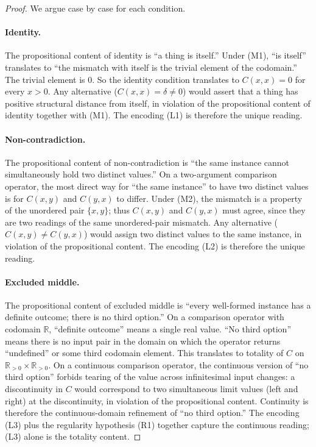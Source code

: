 \documentclass[11pt,a4paper]{article}
\theoremstyle{definition}
\theoremstyle{remark}
\begin{document}
\begin{proof}
We argue case by case for each condition.

\paragraph{Identity.} The propositional content of identity is ``a
thing is itself.'' Under (M1), ``is itself'' translates to ``the
mismatch with itself is the trivial element of the codomain.'' The
trivial element is $0$. So the identity condition translates to
$C(x, x) = 0$ for every $x > 0$. Any alternative
($C(x, x) = \delta \neq 0$) would assert that a thing has positive
structural distance from itself, in violation of the propositional
content of identity together with (M1). The encoding (L1) is therefore
the unique reading.

\paragraph{Non-contradiction.} The propositional content of
non-contradiction is ``the same instance cannot simultaneously hold
two distinct values.'' On a two-argument comparison operator, the
most direct way for ``the same instance'' to have two distinct values
is for $C(x, y)$ and $C(y, x)$ to differ. Under (M2), the mismatch is
a property of the unordered pair $\{x, y\}$; thus $C(x, y)$ and
$C(y, x)$ must agree, since they are two readings of the same
unordered-pair mismatch. Any alternative ($C(x, y) \neq C(y, x)$)
would assign two distinct values to the same instance, in violation
of the propositional content. The encoding (L2) is therefore the
unique reading.

\paragraph{Excluded middle.} The propositional content of excluded
middle is ``every well-formed instance has a definite outcome; there
is no third option.'' On a comparison operator with codomain
$\mathbb{R}$, ``definite outcome'' means a single real value. ``No
third option'' means there is no input pair in the domain on which
the operator returns ``undefined'' or some third codomain element.
This translates to totality of $C$ on
$\mathbb{R}_{>0} \times \mathbb{R}_{>0}$. On a continuous comparison
operator, the continuous version of ``no third option'' forbids
tearing of the value across infinitesimal input changes: a
discontinuity in $C$ would correspond to two simultaneous limit
values (left and right) at the discontinuity, in violation of the
propositional content. Continuity is therefore the continuous-domain
refinement of ``no third option.'' The encoding (L3) plus the
regularity hypothesis (R1) together capture the continuous reading;
(L3) alone is the totality content.


\end{proof}
\end{document}
